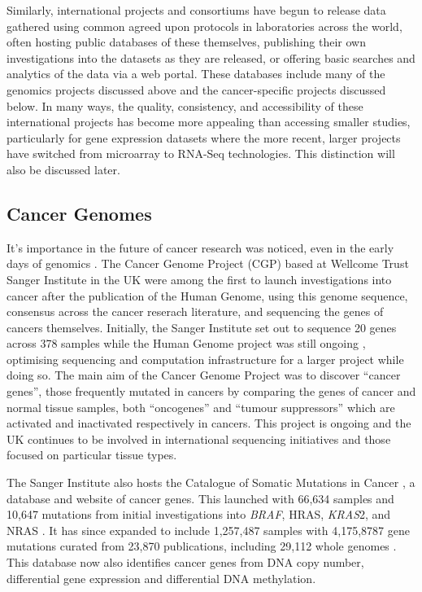 Similarly, international projects and consortiums have begun to release data gathered using common agreed upon protocols in laboratories across the world, often hosting public databases of these themselves, publishing their own investigations into the datasets as they are released, or offering basic searches and analytics of the data via a web portal. These databases include many of the genomics projects discussed above and the cancer-specific projects discussed below. In many ways, the quality, consistency, and accessibility of these international projects has become more appealing than accessing smaller studies, particularly for gene expression datasets where the more recent, larger projects have switched from microarray to RNA-Seq technologies. This distinction will also be discussed later.

\subsection{Cancer Genomes}
It's importance in the future of cancer research was noticed, even in the early days of genomics \citep{Dickson1999}. The Cancer Genome Project (CGP) based at Wellcome Trust Sanger Institute in the UK were among the first to launch investigations into cancer after the publication of the Human Genome, using this genome sequence, consensus across the cancer reserach literature, and sequencing the genes of cancers themselves. Initially, the Sanger Institute set out to sequence 20 genes across 378 samples while the Human Genome project was still ongoing \citep{Collins2007}, optimising sequencing and computation infrastructure for a larger project while doing so. The main aim of the Cancer Genome Project was to discover ``cancer genes'', those frequently mutated in cancers by comparing the genes of cancer and normal tissue samples, both ``oncogenes'' and ``tumour suppressors'' which are activated and inactivated respectively in cancers. This project is ongoing and the UK continues to be involved in international sequencing initiatives and those focused on particular tissue types.

The Sanger Institute also hosts the Catalogue of Somatic Mutations in Cancer \citep{COSMICdb}, a database and website of cancer genes. This launched with 66,634 samples and 10,647 mutations from initial investigations into \textit{BRAF}, HRAS, \textit{KRAS}2, and NRAS \citep{Bamford2004}. It has since expanded to include 1,257,487 samples with 4,175,8787 gene mutations curated from 23,870 publications, including 29,112 whole genomes \citep{COSMICdb}. This database now also identifies cancer genes from DNA copy number, differential gene expression and differential DNA methylation.

